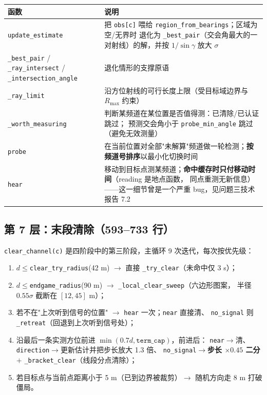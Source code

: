 \begin{longtable}{p{4.6cm}p{10.0cm}}
\toprule
函数 & 说明 \\ \midrule
\endhead
\texttt{update\_estimate} & 把 \texttt{obs[c]} 喂给 \texttt{region\_from\_bearings}；区域为空/无界时
退化为 \texttt{\_best\_pair}（交会角最大的一对射线）的解，并按 $1/\sin\gamma$ 放大 $\sigma$ \\
\texttt{\_best\_pair} / \texttt{\_ray\_intersect} / \texttt{\_intersection\_angle} & 退化情形的支撑原语 \\
\texttt{\_ray\_limit} & 沿方位射线的可行长度上限（受目标域边界与 $R_{\max}$ 约束） \\
\texttt{\_worth\_measuring} & 判断某频道在某位置是否值得测：已清除/已认证跳过；
预测交会角小于 \texttt{probe\_min\_angle} 跳过（避免无效测量） \\
\texttt{probe} & 在当前位置对全部"未解算"频道做一轮检测；\textbf{按频道号排序}以最小化切换时间 \\
\texttt{hear} & 移动到目标点测某频道；\textbf{命中缓存时只付移动时间}（reading 是地点函数，
同点重测无新信息）——这一细节曾是一个严重 bug，见问题三技术报告 7.2 \\
\bottomrule
\end{longtable}

\subsection{第 7 层：末段清除（593--733 行）}

\texttt{clear\_channel(c)} 是四阶段中的第三阶段，主循环 9 次迭代，每次按优先级：

\begin{enumerate}[leftmargin=1.8em]
  \item $d\le$\texttt{clear\_try\_radius}(42 m) $\to$ 直接 \texttt{\_try\_clear}（未命中仅 3 s）；
  \item $d\le$\texttt{endgame\_radius}(90 m) $\to$ \texttt{\_local\_clear\_sweep}（六边形图案，
        半径 $0.55\sigma$ 截断在 $[12,45]$ m）；
  \item 若不在"上次听到信号的位置" $\to$ \texttt{hear} 一次；\texttt{near} 直接清、
        \texttt{no\_signal} 则 \texttt{\_retreat}（回退到上次听到信号处）；
  \item 沿最后一条实测方位前进 $\min(0.7d,\texttt{term\_cap})$，前进后：
        \texttt{near}$\to$清、\texttt{direction}$\to$更新估计并把步长放大 1.3 倍、
        \texttt{no\_signal}$\to$\textbf{步长 $\times0.45$ 二分} $+$ \texttt{\_bracket\_clear}（线段分点清除）；
  \item 若目标点与当前点距离小于 5 m（已到边界被裁剪）$\to$ 随机方向走 8 m 打破僵局。
\end{enumerate}

